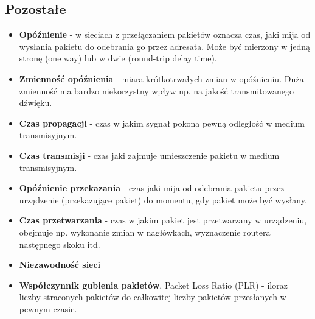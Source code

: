 \documentclass[../main.tex]{subfiles}
\begin{document}
    \subsection{Pozostałe}
    \begin{itemize}
        \item \textbf{Opóźnienie} - w sieciach z przełączaniem pakietów oznacza czas, jaki
        mija od wysłania pakietu do odebrania go przez adresata. Może być mierzony w jedną stronę
        (one way) lub w dwie (round-trip delay time).
        \item \textbf{Zmienność opóźnienia} - miara krótkotrwałych zmian w opóźnieniu.
        Duża zmienność ma bardzo niekorzystny wpływ np. na jakość transmitowanego dźwięku.
        \item \textbf{Czas propagacji} - czas w jakim sygnał pokona pewną odległość w
        medium transmisyjnym.
        \item \textbf{Czas transmisji} - czas jaki zajmuje umieszczenie pakietu w
        medium transmisyjnym.
        \item \textbf{Opóźnienie przekazania} - czas jaki mija od odebrania pakietu
        przez urządzenie (przekazujące pakiet) do momentu, gdy pakiet może być wysłany.
        \item \textbf{Czas przetwarzania} - czas w jakim pakiet jest przetwarzany w
        urządzeniu, obejmuje np. wykonanie zmian w nagłówkach, wyznaczenie routera następnego
        skoku itd.
        \item \textbf{Niezawodność sieci}
        \item \textbf{Współczynnik gubienia pakietów}, Packet Loss Ratio (PLR) - iloraz liczby straconych
        pakietów do całkowitej liczby pakietów przesłanych w pewnym czasie.
    \end{itemize}
\end{document}
